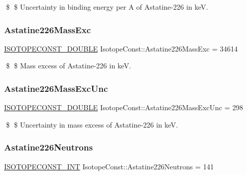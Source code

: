 \$ \$ Uncertainty in binding energy per A of Astatine-\/226 in keV. \mbox{\label{group___isotope_const-_astatine-_at226_gaaa01e26e1b977d2ffd86784ab02437e7}} 
\subsubsection{\texorpdfstring{Astatine226\+Mass\+Exc}{Astatine226MassExc}}
{\footnotesize\ttfamily \mbox{\hyperlink{group___isotope_const-_macros_ga8f45a7272ce02c0b4c65c44636ed719a}{I\+S\+O\+T\+O\+P\+E\+C\+O\+N\+S\+T\+\_\+\+D\+O\+U\+B\+LE}} Isotope\+Const\+::\+Astatine226\+Mass\+Exc = 34614}

\$ \$ Mass excess of Astatine-\/226 in keV. \mbox{\label{group___isotope_const-_astatine-_at226_ga8d37e64f13a09a72d6da30175a0723ee}} 
\subsubsection{\texorpdfstring{Astatine226\+Mass\+Exc\+Unc}{Astatine226MassExcUnc}}
{\footnotesize\ttfamily \mbox{\hyperlink{group___isotope_const-_macros_ga8f45a7272ce02c0b4c65c44636ed719a}{I\+S\+O\+T\+O\+P\+E\+C\+O\+N\+S\+T\+\_\+\+D\+O\+U\+B\+LE}} Isotope\+Const\+::\+Astatine226\+Mass\+Exc\+Unc = 298}

\$ \$ Uncertainty in mass excess of Astatine-\/226 in keV. \mbox{\label{group___isotope_const-_astatine-_at226_ga7b0196190027821d768f58197f18217b}} 
\subsubsection{\texorpdfstring{Astatine226\+Neutrons}{Astatine226Neutrons}}
{\footnotesize\ttfamily \mbox{\hyperlink{group___isotope_const-_macros_ga5f18360b3e99483a35c32d789e62621c}{I\+S\+O\+T\+O\+P\+E\+C\+O\+N\+S\+T\+\_\+\+I\+NT}} Isotope\+Const\+::\+Astatine226\+Neutrons = 141}

